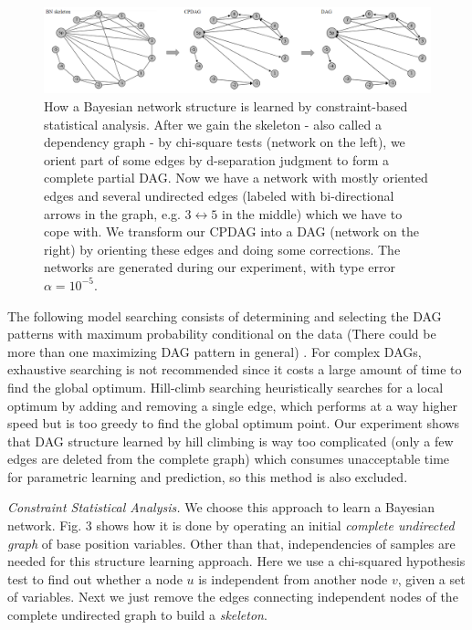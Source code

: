 \documentclass[journal,twoside]{IEEEtran}
\begin{document}
\begin{figure}[htbp]
\centerline{\includegraphics[scale=0.29]{Pics/network.png}}
\caption{How a Bayesian network structure is learned by constraint-based statistical analysis. After we gain the skeleton - also called a dependency graph - by chi-square tests (network on the left), we orient part of some edges by d-separation judgment to form a complete partial DAG. Now we have a network with mostly oriented edges and several undirected edges (labeled with bi-directional arrows in the graph, e.g. $3 \leftrightarrow 5$ in the middle) which we have to cope with. We transform our CPDAG into a DAG (network on the right) by orienting these edges and doing some corrections. The networks are generated during our experiment, with type \uppercase\expandafter{} error $\alpha = 10^{-5}$. }
\label{fig3}
\end{figure}

The following model searching consists of determining and selecting the DAG patterns with maximum probability conditional on the data (There could be more than one maximizing DAG pattern in general) \cite{neapolitan2004learning}. For complex DAGs, exhaustive searching is not recommended since it costs a large amount of time to find the global optimum. Hill-climb searching \cite{tsamardinos2006max} heuristically searches for a local optimum by adding and removing a single edge, which performs at a way higher speed but is too greedy to find the global optimum point. Our experiment shows that DAG structure learned by hill climbing is way too complicated (only a few edges are deleted from the complete graph) which consumes unacceptable time for parametric learning and prediction, so this method is also excluded. 

\emph{Constraint Statistical Analysis.} We choose this approach to learn a Bayesian network. Fig. 3 shows how it is done by operating an initial \textsl{complete undirected graph} of base position variables. Other than that, independencies of samples are needed for this structure learning approach. Here we use a chi-squared hypothesis test \cite{pearson1900x} to find out whether a node $u$ is independent from another node $v$, given a set of variables. Next we just remove the edges connecting independent nodes of the complete undirected graph to build a \textsl{skeleton}. 
\end{document}

